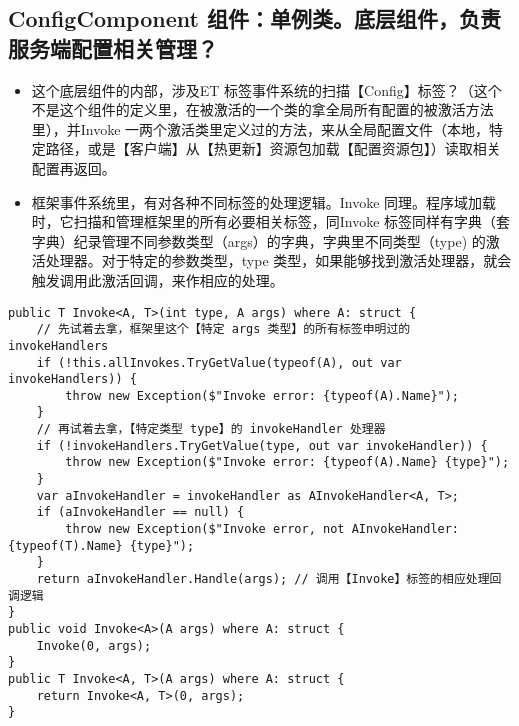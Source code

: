 \documentclass[9pt, b5paper]{article}
\begin{document}
\subsection{ConfigComponent 组件：单例类。底层组件，负责服务端配置相关管理？}
\label{sec-6-5}
\begin{itemize}
\item 这个底层组件的内部，涉及ET 标签事件系统的扫描【Config】标签？（这个不是这个组件的定义里，在被激活的一个类的拿全局所有配置的被激活方法里），并Invoke 一两个激活类里定义过的方法，来从全局配置文件（本地，特定路径，或是【客户端】从【热更新】资源包加载【配置资源包】）读取相关配置再返回。
\item 框架事件系统里，有对各种不同标签的处理逻辑。Invoke 同理。程序域加载时，它扫描和管理框架里的所有必要相关标签，同Invoke 标签同样有字典（套字典）纪录管理不同参数类型（args）的字典，字典里不同类型（type) 的激活处理器。对于特定的参数类型，type 类型，如果能够找到激活处理器，就会触发调用此激活回调，来作相应的处理。
\end{itemize}
\begin{verbatim}
public T Invoke<A, T>(int type, A args) where A: struct {
    // 先试着去拿，框架里这个【特定 args 类型】的所有标签申明过的 invokeHandlers
    if (!this.allInvokes.TryGetValue(typeof(A), out var invokeHandlers)) {
        throw new Exception($"Invoke error: {typeof(A).Name}");
    }
    // 再试着去拿，【特定类型 type】的 invokeHandler 处理器
    if (!invokeHandlers.TryGetValue(type, out var invokeHandler)) {
        throw new Exception($"Invoke error: {typeof(A).Name} {type}");
    }
    var aInvokeHandler = invokeHandler as AInvokeHandler<A, T>;
    if (aInvokeHandler == null) {
        throw new Exception($"Invoke error, not AInvokeHandler: {typeof(T).Name} {type}");
    }
    return aInvokeHandler.Handle(args); // 调用【Invoke】标签的相应处理回调逻辑
}
public void Invoke<A>(A args) where A: struct {
    Invoke(0, args);
}
public T Invoke<A, T>(A args) where A: struct {
    return Invoke<A, T>(0, args);
}
\end{verbatim}
\end{document}
